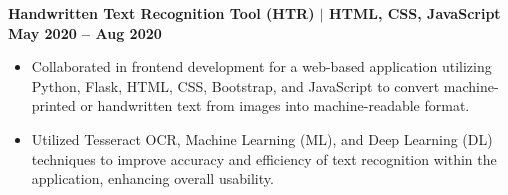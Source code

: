 \documentclass{article}
\begin{document}
\textbf{\textbf{Handwritten Text Recognition Tool (HTR) }  $\mid$ \textbf{HTML, CSS, JavaScript} } \hfill \textbf{\textbf{May 2020 – Aug 2020} }
\begin{itemize}[noitemsep,nolistsep,leftmargin=*]
    \item Collaborated in frontend development for a web-based application utilizing Python, Flask, HTML, CSS, Bootstrap, and JavaScript to convert machine-printed or handwritten text from images into machine-readable format.
    \item Utilized Tesseract OCR, Machine Learning (ML), and Deep Learning (DL) techniques to improve accuracy and efficiency of text recognition within the application, enhancing overall usability.
\end{itemize}







\end{document}
